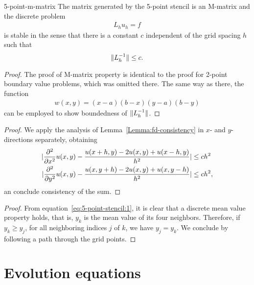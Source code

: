 \begin{Theorem}{5-point-m-matrix}
  The matrix generated by the 5-point stencil is an M-matrix and the
  discrete problem
  \begin{gather*}
    L_h u_h = f
  \end{gather*}
  is stable in the sense that there is a constant $c$ independent of
  the grid spacing $h$ such that
  \begin{gather*}
    \lVert L_h^{-1}\rVert \le c.
  \end{gather*}
\end{Theorem}

\begin{proof}
  The proof of M-matrix property is identical to the proof for 2-point
  boundary value problems, which was omitted there.  The same way as
  there, the function
  \begin{gather*}
    w(x,y) = (x-a)(b-x)(y-a)(b-y)
  \end{gather*}
  can be employed to show boundedness of $\lVert L_h^{-1}\rVert$.
\end{proof}



\begin{proof}
  We apply the analysis of Lemma~\ref{Lemma:fd-consistency} in $x$-
  and $y$-directions separately, obtaining
  \begin{align*}
    \lvert\frac{\partial^2}{\partial x^2} u(x,y)
      - \frac{u(x+h,y) -2u(x,y) + u(x-h,y)}{h^2}\rvert & \le c h^2 \\
    \lvert\frac{\partial^2}{\partial y^2} u(x,y)
      - \frac{u(x,y+h) -2u(x,y) + u(x,y-h)}{h^2}\rvert & \le c h^2,
  \end{align*}
  an conclude consistency of the sum.
\end{proof}



\begin{proof}
  From equation~\eqref{eq:5-point-stencil:1}, it is clear that a
  discrete mean value property holds, that is, $y_k$ is the mean value
  of its four neighbors. Therefore, if $y_k \ge y_j$, for all
  neighboring indices $j$ of $k$, we have $y_j = y_k$. We conclude by
  following a path through the grid points.
\end{proof}

\section{Evolution equations}

